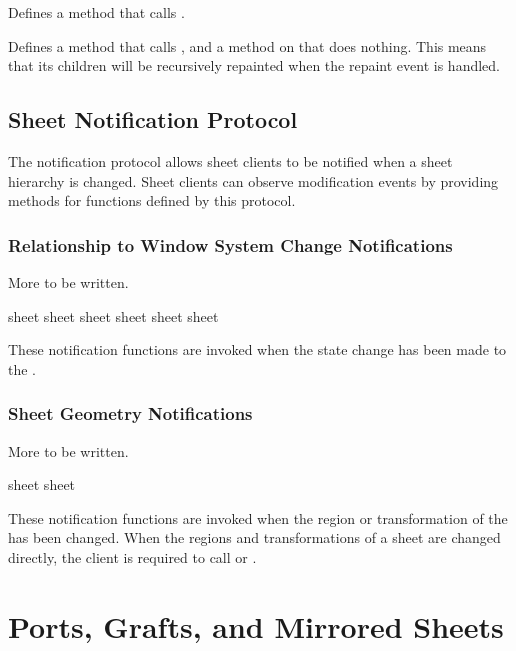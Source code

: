 Defines a  method that calls .


Defines a  method that calls , and a
method on  that does nothing.  This means that its children
will be recursively repainted when the repaint event is handled.


\section {Sheet Notification Protocol}

The notification protocol allows sheet clients to be notified when a sheet
hierarchy is changed.  Sheet clients can observe modification events by
providing  methods for functions defined by this protocol.

\subsection {Relationship to Window System Change Notifications}

 {More to be written.}

   {sheet}
 {sheet}
   {sheet}
  {sheet}
   {sheet}
  {sheet}

These notification functions are invoked when the state change has been made to
the  .


\subsection {Sheet Geometry Notifications}

 {More to be written.}

 {sheet}
 {sheet}

These notification functions are invoked when the region or transformation of
the  has been changed.  When the regions and
transformations of a sheet are changed directly, the client is required to call
 or .


\chapter {Ports, Grafts, and Mirrored Sheets}
\label{ports-and-grafts}

